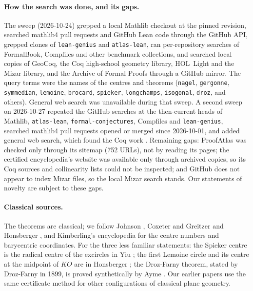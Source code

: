 \documentclass[11pt]{article}
\theoremstyle{definition}
\theoremstyle{remark}
\newcommand{\lean}[1]{\texttt{#1}}
\begin{document}
\paragraph{How the search was done, and its gaps.} The sweep (2026-10-24) grepped a local Mathlib
checkout at the pinned revision, searched mathlib4 pull requests and GitHub Lean code through the
GitHub API, grepped clones of \lean{lean-genius} and \lean{atlas-lean}, ran per-repository searches of
FormalBook, Compfiles and other benchmark collections, and searched local copies of GeoCoq, the Coq
high-school geometry library, HOL~Light and the Mizar library, and the Archive of Formal Proofs
through a GitHub mirror. The query terms were the names of the centres and theorems
(\lean{nagel}, \lean{gergonne}, \lean{symmedian}, \lean{lemoine}, \lean{brocard}, \lean{spieker},
\lean{longchamps}, \lean{isogonal}, \lean{droz}, and others). General web search was unavailable during
that sweep. A second sweep on 2026-10-27 repeated the GitHub searches at the then-current heads of
Mathlib, \lean{atlas-lean}, \lean{formal-conjectures}, Compfiles and \lean{lean-genius}, searched
mathlib4 pull requests opened or merged since 2026-10-01, and added general web search, which found
the Coq work \cite{certifiedetc}. Remaining gaps: ProofAtlas was checked only through its sitemap (752
URLs), not by reading its pages; the certified encyclopedia's website was available only through
archived copies, so its Coq sources and collinearity lists could not be inspected; and GitHub does not
appear to index Mizar files, so the local Mizar search stands. Our statements of novelty are subject
to these gaps.

\paragraph{Classical sources.} The theorems are classical; we follow Johnson \cite{johnson1929},
Coxeter and Greitzer \cite{coxetergreitzer} and Honsberger \cite{honsberger}, and Kimberling's
encyclopedia \cite{etc} for the centre numbers and barycentric coordinates. For the three less
familiar statements: the Spieker centre is the radical centre of the excircles in Yiu
\cite[\S7.3.3, p.~94]{yiu}; the first Lemoine circle and its centre at the midpoint of $KO$ are in
Honsberger \cite[Ch.~9, \S5, pp.~94--95]{honsberger}; the Droz-Farny theorem, stated by Droz-Farny in
1899, is proved synthetically by Ayme \cite{ayme}. Our earlier papers
\cite{paperA,paperB,paperC,paperD,paperE,paperF} use the same certificate method for other
configurations of classical plane geometry.
\end{document}
